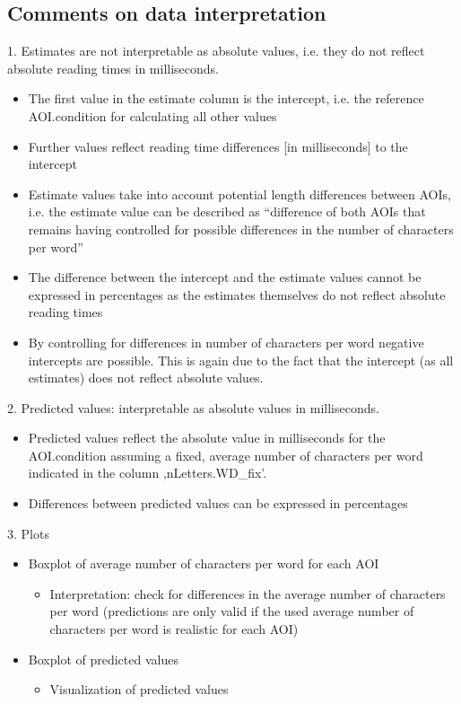 \subsection{Comments on data interpretation}

1. Estimates are not interpretable as absolute values, i.e. they do not reflect absolute reading times in milliseconds.
\begin{itemize}
  \item The first value in the estimate column is the intercept, i.e. the reference AOI.condition for calculating all other values
  \item Further values reflect reading time differences [in milliseconds] to the intercept
  \item Estimate values take into account potential length differences between AOIs, i.e. the estimate value can be described as “difference of both AOIs that remains having controlled for possible differences in the number of characters per word”
  \item The difference between the intercept and the estimate values cannot be expressed in percentages as the estimates themselves do not reflect absolute reading times
  \item By controlling for differences in number of characters per word negative intercepts are possible. This is again due to the fact that the intercept (as all estimates) does not reflect absolute values.
\end{itemize}

2. Predicted values: interpretable as absolute values in milliseconds.
\begin{itemize}
  \item Predicted values reflect the absolute value in milliseconds for the AOI.condition assuming a fixed, average number of characters per word indicated in the column ‚nLetters.WD\_fix'.
  \item Differences between predicted values can be expressed in percentages
\end{itemize}

3. Plots
\begin{itemize}
  \item Boxplot of average number of characters per word for each AOI
  \begin{itemize}
    \item Interpretation: check for differences in the average number of characters per word (predictions are only valid if the used average number of characters per word is realistic for each AOI)
  \end{itemize}
  \item Boxplot of predicted values
  \begin{itemize}
    \item Visualization of predicted values
  \end{itemize}
\end{itemize}